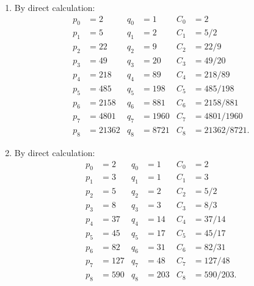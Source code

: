 \begin{solution}
\begin{enumerate}
\begin{align*}
            p_5 &= 2889 & q_5 &= 1292 & C_5 &= 2889/1292 \\
            p_6 &= 12238 & q_6 &= 5473 & C_6 &= 12238/5473 \\
            p_7 &= 51841 & q_7 &= 23184 & C_7 &= 51841/23184 \\
            p_8 &= 219602 & q_8 &= 98209 & C_8 &= 219602/98209.
        \end{align*}
        \item By direct calculation:
        \begin{align*}
            p_0 &= 2 & q_0 &= 1 & C_0 &= 2 \\
            p_1 &= 5 & q_1 &= 2 & C_1 &= 5/2 \\
            p_2 &= 22 & q_2 &= 9 & C_2 &= 22/9 \\
            p_3 &= 49 & q_3 &= 20 & C_3 &= 49/20 \\
            p_4 &= 218 & q_4 &= 89 & C_4 &= 218/89 \\
            p_5 &= 485 & q_5 &= 198 & C_5 &= 485/198 \\
            p_6 &= 2158 & q_6 &= 881 & C_6 &= 2158/881 \\
            p_7 &= 4801 & q_7 &= 1960 & C_7 &= 4801/1960 \\
            p_8 &= 21362 & q_8 &= 8721 & C_8 &= 21362/8721.
        \end{align*}
        \item By direct calculation:
        \begin{align*}
            p_0 &= 2 & q_0 &= 1 & C_0 &= 2 \\
            p_1 &= 3 & q_1 &= 1 & C_1 &= 3 \\
            p_2 &= 5 & q_2 &= 2 & C_2 &= 5/2 \\
            p_3 &= 8 & q_3 &= 3 & C_3 &= 8/3 \\
            p_4 &= 37 & q_4 &= 14 & C_4 &= 37/14 \\
            p_5 &= 45 & q_5 &= 17 & C_5 &= 45/17 \\
            p_6 &= 82 & q_6 &= 31 & C_6 &= 82/31 \\
            p_7 &= 127 & q_7 &= 48 & C_7 &= 127/48 \\
            p_8 &= 590 & q_8 &= 203 & C_8 &= 590/203. \\
        \end{align*}
    \end{enumerate}
\end{solution}

